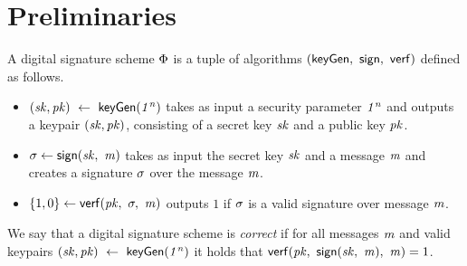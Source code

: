 \section{Preliminaries}
\label{sec:preliminaries}


\begin{definition}\label{def:signatureScheme}
    A  digital signature scheme $\Phi$ is a tuple of algorithms $(\mathsf{keyGen} ,~ \mathsf{sign} ,~ \mathsf{verf})$ defined as follows. 
    \begin{itemize}
    	\item $(\mathit{sk}, \mathit{pk}) ~\leftarrow~ \mathsf{keyGen}(\mathit{1^n})$ takes as input a security parameter $\mathit{1^n}$ and outputs a keypair $(\mathit{sk}, \mathit{pk})$, consisting of a secret key $\mathit{sk}$ and a public key $\mathit{pk}$.
    	\item $\sigma \gets \mathsf{sign}(\mathit{sk} ,~ \mathit{m})$ takes as input the secret key $\mathit{sk}$ and a message $\mathit{m}$ and creates a signature $\sigma$ over the message $\mathit{m}$.
    	\item $\{1,0\} \gets \mathsf{verf}(\mathit{pk} ,~ \sigma ,~ \mathit{m})$ outputs $1$ if $\sigma$ is a valid signature over message $\mathit{m}$. 
    \end{itemize}
 \end{definition} 
  
 \begin{definition}
 We say that a digital signature scheme is \emph{correct} if for all messages $\mathit{m}$ and valid keypairs $(\mathit{sk}, \mathit{pk}) ~\leftarrow~ \mathsf{keyGen}(\mathit{1^n})$ it holds that $\mathsf{verf}(\mathit{pk} ,~ \mathsf{sign}(\mathit{sk} ,~ \mathit{m}) ,~ \mathit{m}) = 1$.
 \end{definition}
 
